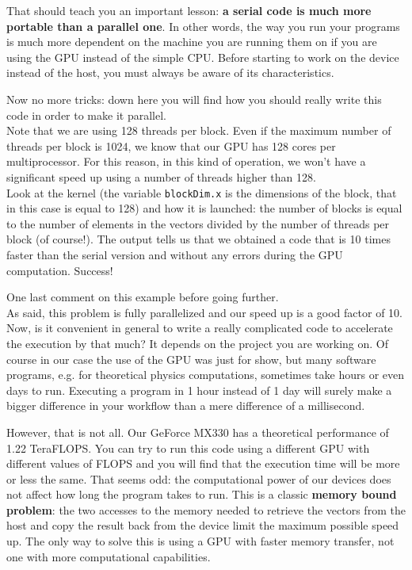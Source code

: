 That should teach you an important lesson: \textbf{a serial code is much more portable than a parallel one}. In other words, the way you run your programs is much more dependent on the machine you are running them on if you are using the GPU instead of the simple CPU. Before starting to work on the device instead of the host, you must always be aware of its characteristics. 

Now no more tricks: down here you will find how you should really write this code in order to make it parallel. \\Note that we are using 128 threads per block. Even if the maximum number of threads per block is 1024, we know that our GPU has 128 cores per multiprocessor. For this reason, in this kind of operation, we won't have a significant speed up using a number of threads higher than 128. \\ Look at the kernel (the variable \texttt{blockDim.x} is the dimensions of the block, that in this case is equal to 128) and how it is launched: the number of blocks is equal to the number of elements in the vectors divided by the number of threads per block (of course!). The output tells us that we obtained a code that is 10 times faster than the serial version and without any errors during the GPU computation. Success!



One last comment on this example before going further. \\
As said, this problem is fully parallelized and our speed up is a good factor of 10. Now, is it convenient in general to write a really complicated code to accelerate the execution by that much? It depends on the project you are working on. Of course in our case the use of the GPU was just for show, but many software programs, e.g. for theoretical physics computations, sometimes take hours or even days to run. Executing a program in 1 hour instead of 1 day will surely make a bigger difference in your workflow than a mere difference of a millisecond. 

However, that is not all. Our GeForce MX330 has a theoretical performance of 1.22 TeraFLOPS. You can try to run this code using a different GPU with different values of FLOPS and you will find that the execution time will be more or less the same. That seems odd: the computational power of our devices does not affect how long the program takes to run. This is a classic \textbf{memory bound problem}: the two accesses to the memory needed to retrieve the vectors from the host and copy the result back from the device limit the maximum possible speed up. The only way to solve this is using a GPU with faster memory transfer, not one with more computational capabilities. 

